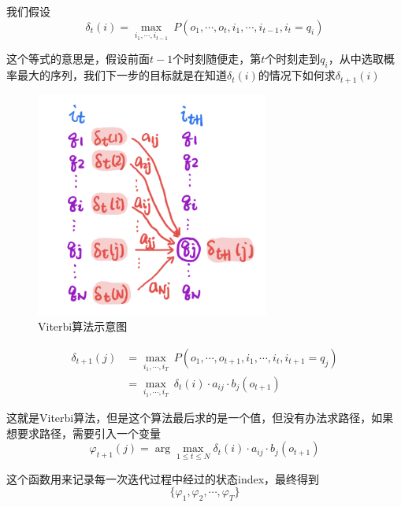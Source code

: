 我们假设
\begin{equation}
    \delta_t(i)=\max\limits_{i_1,\cdots,i_{t-1}}\ P(o_1,\cdots,o_t,i_1,\cdots,i_{t-1},i_t=q_i)
\end{equation}

这个等式的意思是，假设前面$t-1$个时刻随便走，第$t$个时刻走到$q_i$，从中选取概率最大的序列，我们下一步的目标就是在知道$\delta_t(i)$的情况下如何求$\delta_{t+1}(i)$

\begin{figure}[H]
    \centering
    \includegraphics[scale=0.6]{figures/V.png}
    \caption{Viterbi算法示意图}
\end{figure}

\begin{equation}
    \begin{aligned}
        \delta_{t+1}(j)&=\max\limits_{i_1,\cdots,i_T}\ P(o_1,\cdots,o_{t+1},i_1,\cdots,i_t,i_{t+1}=q_j)\\
        &=\max\limits_{i_1,\cdots,i_T}\ \delta_t(i)\cdot a_{ij}\cdot b_j(o_{t+1})
    \end{aligned}
\end{equation}

这就是Viterbi算法，但是这个算法最后求的是一个值，但没有办法求路径，如果想要求路径，需要引入一个变量
\begin{equation}
    \varphi_{t+1}(j)=\arg\max_{1\leqslant t\leqslant N}\delta_t(i)\cdot a_{ij}\cdot b_j(o_{t+1})
\end{equation}

这个函数用来记录每一次迭代过程中经过的状态index，最终得到
\begin{equation}
    \{\varphi_1,\varphi_2,\cdots,\varphi_T\}
\end{equation}